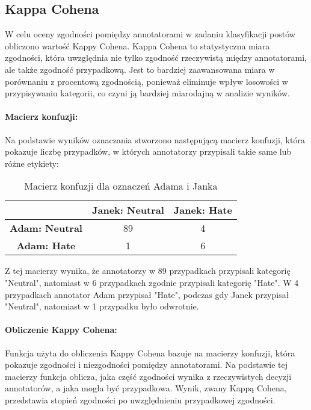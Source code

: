 \documentclass[12pt]{article}
\begin{document}
\subsection{Kappa Cohena}

W celu oceny zgodności pomiędzy annotatorami w zadaniu klasyfikacji postów obliczono wartość Kappy Cohena. Kappa Cohena to statystyczna miara zgodności, która uwzględnia nie tylko zgodność rzeczywistą między annotatorami, ale także zgodność przypadkową. Jest to bardziej zaawansowana miara w porównaniu z procentową zgodnością, ponieważ eliminuje wpływ losowości w przypisywaniu kategorii, co czyni ją bardziej miarodajną w analizie wyników.

\paragraph{Macierz konfuzji:}
Na podstawie wyników oznaczania stworzono następującą macierz konfuzji, która pokazuje liczbę przypadków, w których annotatorzy przypisali takie same lub różne etykiety:

\begin{table}[h!]
\centering
\begin{tabular}{|c|c|c|}
\hline
           & \textbf{Janek: Neutral} & \textbf{Janek: Hate} \\ \hline
\textbf{Adam: Neutral} & 89                      & 4                   \\ \hline
\textbf{Adam: Hate}    & 1                       & 6                   \\ \hline
\end{tabular}
\caption{Macierz konfuzji dla oznaczeń Adama i Janka}
\end{table}

Z tej macierzy wynika, że annotatorzy w 89 przypadkach przypisali kategorię "Neutral", natomiast w 6 przypadkach zgodnie przypisali kategorię "Hate". W 4 przypadkach annotator Adam przypisał "Hate", podczas gdy Janek przypisał "Neutral", natomiast w 1 przypadku było odwrotnie.

\paragraph{Obliczenie Kappy Cohena:}
Funkcja użyta do obliczenia Kappy Cohena bazuje na macierzy konfuzji, która pokazuje zgodności i niezgodności pomiędzy annotatorami. Na podstawie tej macierzy funkcja oblicza, jaka część zgodności wynika z rzeczywistych decyzji annotatorów, a jaka mogła być przypadkowa. Wynik, zwany Kappą Cohena, przedstawia stopień zgodności po uwzględnieniu przypadkowej zgodności.
\end{document}
